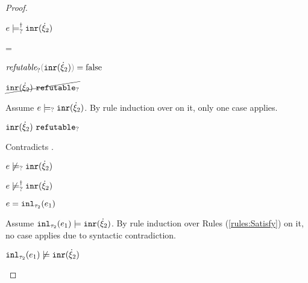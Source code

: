 \begin{proof}
\begin{byCases}
\begin{byCases}
\begin{byCases}
\begin{pfsteps*}
            \item $e \models_{?}^{\dag} \mathtt{inr}(\dot{\xi}_2)$ 
            \end{pfsteps*}
        \item[\frefutable{\cinr{\hxi_2}}=\false]
            \begin{pfsteps*}
            \item $\frefutable{\cinr{\hxi_2}}=\false$  
            \item $\cancel{\mathtt{inr}(\dot{\xi}_2) ~\mathtt{refutable}_?}$  
            \end{pfsteps*}
            Assume $e \models_{?} \mathtt{inr}(\dot{\xi}_2)$. By rule induction over  on it, only one case applies.
            \begin{byCases}
            \item[\text{(\ref{rule:CMSNotIntro})}]
                \begin{pfsteps*}
                \item $\mathtt{inr}(\dot{\xi}_2) ~\mathtt{refutable}_?$ 
                \end{pfsteps*}
                Contradicts .
            \end{byCases}
            \begin{pfsteps*}
            \item $e \not\models_{?} \mathtt{inr}(\dot{\xi}_2)$  
            \item $e \not\models_{?}^{\dag} \mathtt{inr}(\dot{\xi}_2)$ 
            \end{pfsteps*}
        \end{byCases}
    \item[\text{(\ref{rule:TInl})}]
        \begin{pfsteps*}
        \item $e=\mathtt{inl}_{\tau_2}({e_1})$ 
        \end{pfsteps*}
        Assume $\mathtt{inl}_{\tau_2}({e_1}) \models \mathtt{inr}(\dot{\xi}_2)$. By rule induction over Rules (\ref{rules:Satisfy}) on it, no case applies due to syntactic contradiction.
        \begin{pfsteps*}
        \item $\mathtt{inl}_{\tau_2}({e_1}) \not\models \mathtt{inr}(\dot{\xi}_2)$  

\end{pfsteps*}
\end{byCases}
\end{byCases}
\end{proof}
